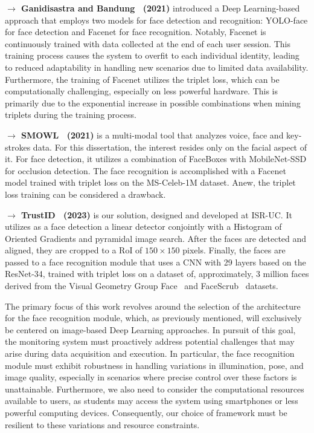 \documentclass[class=report, crop=false, a4paper, 12pt]{standalone}
\begin{document}
\vspace{0.7\baselineskip}
\noindent\textbf{$\rightarrow$ Ganidisastra and Bandung~\autocite{ganidisastraIncrementalTrainingDeep2021} (2021)} introduced a Deep Learning-based approach that employs two models for face detection and recognition: YOLO-face for face detection and Facenet for face recognition. Notably, Facenet is continuously trained with data collected at the end of each user session. This training process causes the system to overfit to each individual identity, leading to reduced adaptability in handling new scenarios due to limited data availability. Furthermore, the training of Facenet utilizes the triplet loss, which can be computationally challenging, especially on less powerful hardware. This is primarily due to the exponential increase in possible combinations when mining triplets during the training process.

\vspace{0.7\baselineskip}
\noindent\textbf{$\rightarrow$ SMOWL~\autocite{labayenOnlineStudentAuthentication2021} (2021)} is a multi-modal tool that analyzes voice, face and key-strokes data. For this dissertation, the interest resides only on the facial aspect of it. For face detection, it utilizes a combination of FaceBoxes with MobileNet-SSD for occlusion detection. The face recognition is accomplished with a Facenet model trained with triplet loss on the MS-Celeb-1M dataset. Anew, the triplet loss training can be considered a drawback. 

\vspace{0.7\baselineskip}
\noindent\textbf{$\rightarrow$ TrustID~\autocite{fariaImagebasedFaceVerification2023} (2023)} is our solution, designed and developed at \acrshort{ISR-UC}. It utilizes as a face detection a linear detector conjointly with a Histogram of Oriented Gradients and pyramidal image search. After the faces are detected and aligned, they are cropped to a \gls{RoI} of $150\times150$ pixels. Finally, the faces are passed to a face recognition module that uses a CNN with 29 layers based on the ResNet-34, trained with triplet loss on a dataset of, approximately, 3 million faces derived from the Visual Geometry Group
Face~\autocite{parkhiDeepFaceRecognition2015} and FaceScrub~\autocite{ngDatadrivenApproachCleaning2014} datasets.


\vspace{\baselineskip}
\par The primary focus of this work revolves around the selection of the architecture for the face recognition module, which, as previously mentioned, will exclusively be centered on image-based Deep Learning approaches. In pursuit of this goal, the monitoring system must proactively address potential challenges that may arise during data acquisition and execution. In particular, the face recognition module must exhibit robustness in handling variations in illumination, pose, and image quality, especially in scenarios where precise control over these factors is unattainable. Furthermore, we also need to consider the computational resources available to users, as students may access the system using smartphones or less powerful computing devices. Consequently, our choice of framework must be resilient to these variations and resource constraints.
\end{document}
